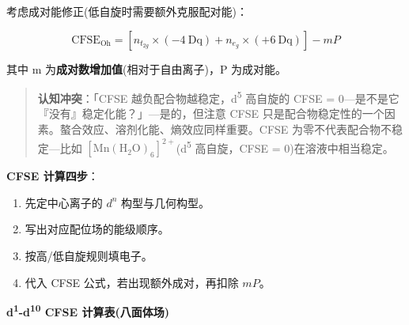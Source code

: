 考虑成对能修正(低自旋时需要额外克服配对能)：

\[
\mathrm{CFSE_{Oh}} = [n_{t_{2g}} \times (-4\ \mathrm{Dq}) + n_{e_g} \times (+6\ \mathrm{Dq})] - mP
\]

其中 m 为\textbf{成对数增加值}(相对于自由离子)，P 为成对能。

\begin{quote}
\textbf{认知冲突}：「CFSE 越负配合物越稳定，d\textsuperscript{5} 高自旋的 CFSE = 0---是不是它『没有』稳定化能？」---是的，但注意 CFSE 只是配合物稳定性的一个因素。螯合效应、溶剂化能、熵效应同样重要。CFSE 为零不代表配合物不稳定---比如 \([\mathrm{Mn(H_2O)_6}]^{2+}\)(d\textsuperscript{5} 高自旋，CFSE = 0)在溶液中相当稳定。
\end{quote}

\textbf{CFSE 计算四步}：

\begin{enumerate}
\def\labelenumi{\arabic{enumi}.}
\tightlist
\item
  先定中心离子的 \(d^n\) 构型与几何构型。
\item
  写出对应配位场的能级顺序。
\item
  按高/低自旋规则填电子。
\item
  代入 CFSE 公式，若出现额外成对，再扣除 \(mP\)。
\end{enumerate}

\textbf{d\textsuperscript{1}-d\textsuperscript{10} CFSE 计算表(八面体场)}

